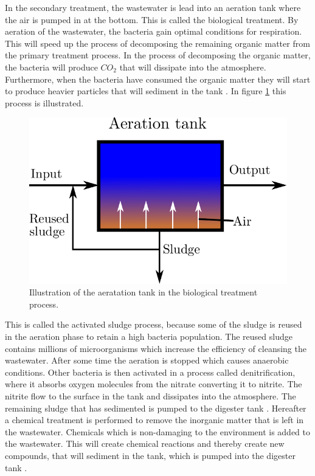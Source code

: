 In the secondary treatment, the wastewater is lead into an aeration tank where the air is pumped in at the bottom. This is called the biological treatment. By aeration of the wastewater, the bacteria gain optimal conditions for respiration. This will speed up the process of decomposing the remaining organic matter from the primary treatment process. In the process of decomposing the organic matter, the bacteria will produce $CO_2$ that will dissipate into the atmosphere. Furthermore, when the bacteria have consumed the organic matter they will start to produce heavier particles that will sediment in the tank \cite{wwtp_ekstra}. In figure \ref{fig:secondary_treatment} this process is illustrated.



\begin{figure}[H]
\centering
\includegraphics[width=.5\textwidth]{report/introduction/pictures/aeration_tank.pdf}
\caption{Illustration of the aeratation tank in the biological treatment process.}
\label{fig:secondary_treatment}%
\end{figure} 
This is called the activated sludge process, because some of the sludge is reused in the aeration phase to retain a high bacteria population. %
The reused sludge contains millions of microorganisms which increase the efficiency of cleansing the wastewater. 
After some time the aeration is stopped which causes anaerobic conditions. Other bacteria is then activated in a process called denitrification, where it absorbs oxygen molecules from the nitrate converting it to nitrite. The nitrite flow to the surface in the tank and dissipates into the atmosphere.
The remaining sludge that has sedimented is pumped to the digester tank \cite{epa_wwtp, rossi2014nitrate}. 
Hereafter a chemical treatment is performed to remove the inorganic matter that is left in the wastewater. Chemicals which is non-damaging to the environment is added to the wastewater.
This will create chemical reactions and thereby create new compounds, that will sediment in the tank, which is pumped into the digester tank \cite{youtube_wastewater}.  


